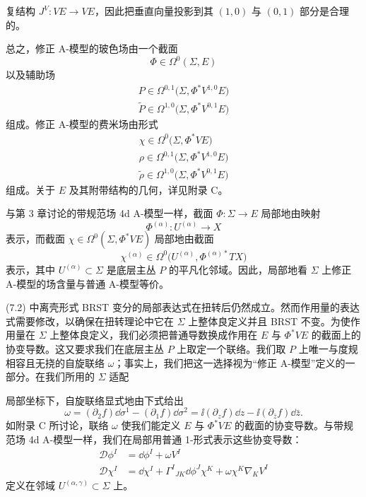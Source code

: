 复结构 $J^V:VE\to VE$，因此把垂直向量投影到其 $(1,0)$ 与 $(0,1)$ 部分是合理的。

总之，修正 A-模型的玻色场由一个截面
\[
\Phi\in\Omega^0(\Sigma,E)
\]
以及辅助场
\begin{gather*}
P\in\Omega^{0,1}\big(\Sigma,\Phi^*V^{1,0}E\big)\\
\tilde P\in\Omega^{1,0}\big(\Sigma,\Phi^*V^{0,1}E\big)
\end{gather*}
组成。修正 A-模型的费米场由形式
\begin{gather*}
\chi\in\Omega^0\big(\Sigma,\Phi^*VE\big)\\
\rho\in\Omega^{0,1}\big(\Sigma,\Phi^*V^{1,0}E\big)\\
\tilde\rho\in\Omega^{1,0}\big(\Sigma,\Phi^*V^{0,1}E\big)
\end{gather*}
组成。关于 $E$ 及其附带结构的几何，详见附录 C。

与第 3 章讨论的带规范场 4d A-模型一样，截面 $\Phi:\Sigma\to E$ 局部地由映射
\[
\Phi^{(\alpha)}:U^{(\alpha)}\to X
\]
表示，而截面 $\chi\in\Omega^0(\Sigma,\Phi^*VE)$ 局部地由截面
\[
\chi^{(\alpha)}\in\Omega^0\big(U^{(\alpha)},\Phi^{(\alpha)*}TX\big)
\]
表示，其中 $U^{(\alpha)}\subset\Sigma$ 是底层主丛 $P$ 的平凡化邻域。因此，局部地看 $\Sigma$ 上修正 A-模型的场含量与普通 A-模型等价。



(7.2) 中离壳形式 BRST 变分的局部表达式在扭转后仍然成立。然而作用量的表达式需要修改，以确保在扭转理论中它在 $\Sigma$ 上整体良定义并且 BRST 不变。为使作用量在 $\Sigma$ 上整体良定义，我们必须把普通导数换成作用在 $E$ 与 $\Phi^*VE$ 的截面上的协变导数。这又要求我们在底层主丛 $P$ 上取定一个联络。我们取 $P$ 上唯一与度规相容且无挠的自旋联络 $\omega$；事实上，我们把这一选择视为“修正 A-模型”定义的一部分。在我们所用的 $\Sigma$ 适配

局部坐标下，自旋联络显式地由下式给出
\begin{equation}
\omega=(\partial_2f)\dd\sigma^1-(\partial_1f)\dd\sigma^2=\ii(\partial_zf)\dd z-\ii(\partial_{\bar z}f)\dd\bar z . \tag{7.6}
\end{equation}
如附录 C 所讨论，联络 $\omega$ 使我们能定义 $E$ 与 $\Phi^*VE$ 的截面的协变导数。与带规范场 4d A-模型一样，我们在局部用普通 1-形式表示这些协变导数：
\[
\begin{aligned}
\mathcal{D}\phi^I&=\dd\phi^I+\omega V^I\\
\mathcal{D}\chi^I&=\dd\chi^I+\Gamma^I{}_{JK}\dd\phi^J\chi^K+\omega\chi^K\nabla_KV^I
\end{aligned}
\]
定义在邻域 $U^{(\alpha,\gamma)}\subset\Sigma$ 上。

